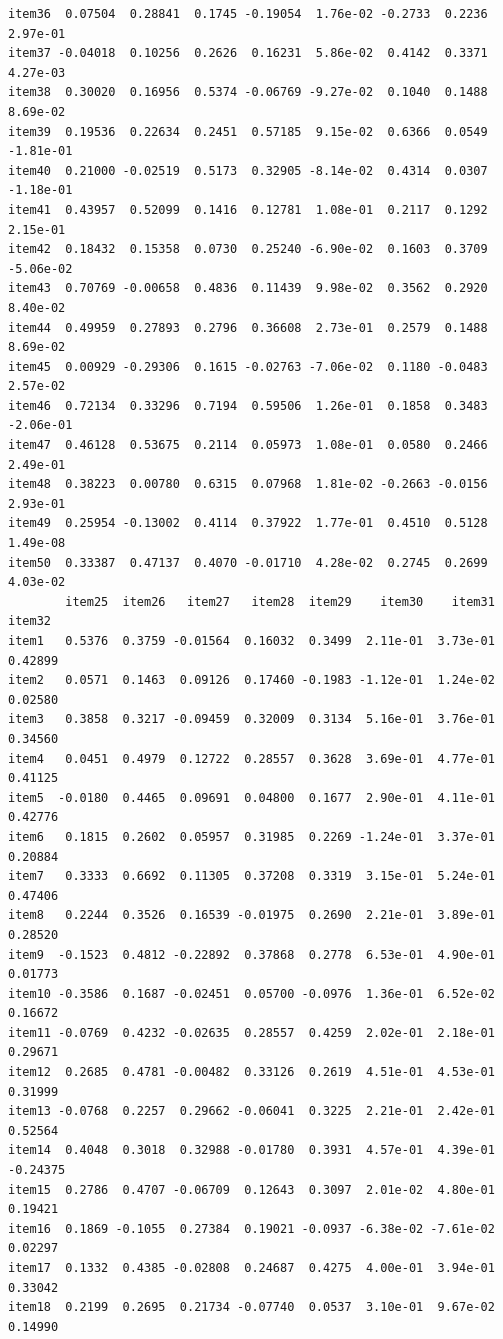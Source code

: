 \documentclass[
  a4paper,
]{ltjsbook}
\begin{document}
\begin{verbatim}
item36  0.07504  0.28841  0.1745 -0.19054  1.76e-02 -0.2733  0.2236  2.97e-01
item37 -0.04018  0.10256  0.2626  0.16231  5.86e-02  0.4142  0.3371  4.27e-03
item38  0.30020  0.16956  0.5374 -0.06769 -9.27e-02  0.1040  0.1488  8.69e-02
item39  0.19536  0.22634  0.2451  0.57185  9.15e-02  0.6366  0.0549 -1.81e-01
item40  0.21000 -0.02519  0.5173  0.32905 -8.14e-02  0.4314  0.0307 -1.18e-01
item41  0.43957  0.52099  0.1416  0.12781  1.08e-01  0.2117  0.1292  2.15e-01
item42  0.18432  0.15358  0.0730  0.25240 -6.90e-02  0.1603  0.3709 -5.06e-02
item43  0.70769 -0.00658  0.4836  0.11439  9.98e-02  0.3562  0.2920  8.40e-02
item44  0.49959  0.27893  0.2796  0.36608  2.73e-01  0.2579  0.1488  8.69e-02
item45  0.00929 -0.29306  0.1615 -0.02763 -7.06e-02  0.1180 -0.0483  2.57e-02
item46  0.72134  0.33296  0.7194  0.59506  1.26e-01  0.1858  0.3483 -2.06e-01
item47  0.46128  0.53675  0.2114  0.05973  1.08e-01  0.0580  0.2466  2.49e-01
item48  0.38223  0.00780  0.6315  0.07968  1.81e-02 -0.2663 -0.0156  2.93e-01
item49  0.25954 -0.13002  0.4114  0.37922  1.77e-01  0.4510  0.5128  1.49e-08
item50  0.33387  0.47137  0.4070 -0.01710  4.28e-02  0.2745  0.2699  4.03e-02
        item25  item26   item27   item28  item29    item30    item31   item32
item1   0.5376  0.3759 -0.01564  0.16032  0.3499  2.11e-01  3.73e-01  0.42899
item2   0.0571  0.1463  0.09126  0.17460 -0.1983 -1.12e-01  1.24e-02  0.02580
item3   0.3858  0.3217 -0.09459  0.32009  0.3134  5.16e-01  3.76e-01  0.34560
item4   0.0451  0.4979  0.12722  0.28557  0.3628  3.69e-01  4.77e-01  0.41125
item5  -0.0180  0.4465  0.09691  0.04800  0.1677  2.90e-01  4.11e-01  0.42776
item6   0.1815  0.2602  0.05957  0.31985  0.2269 -1.24e-01  3.37e-01  0.20884
item7   0.3333  0.6692  0.11305  0.37208  0.3319  3.15e-01  5.24e-01  0.47406
item8   0.2244  0.3526  0.16539 -0.01975  0.2690  2.21e-01  3.89e-01  0.28520
item9  -0.1523  0.4812 -0.22892  0.37868  0.2778  6.53e-01  4.90e-01  0.01773
item10 -0.3586  0.1687 -0.02451  0.05700 -0.0976  1.36e-01  6.52e-02  0.16672
item11 -0.0769  0.4232 -0.02635  0.28557  0.4259  2.02e-01  2.18e-01  0.29671
item12  0.2685  0.4781 -0.00482  0.33126  0.2619  4.51e-01  4.53e-01  0.31999
item13 -0.0768  0.2257  0.29662 -0.06041  0.3225  2.21e-01  2.42e-01  0.52564
item14  0.4048  0.3018  0.32988 -0.01780  0.3931  4.57e-01  4.39e-01 -0.24375
item15  0.2786  0.4707 -0.06709  0.12643  0.3097  2.01e-02  4.80e-01  0.19421
item16  0.1869 -0.1055  0.27384  0.19021 -0.0937 -6.38e-02 -7.61e-02  0.02297
item17  0.1332  0.4385 -0.02808  0.24687  0.4275  4.00e-01  3.94e-01  0.33042
item18  0.2199  0.2695  0.21734 -0.07740  0.0537  3.10e-01  9.67e-02  0.14990

\end{verbatim}
\end{document}
